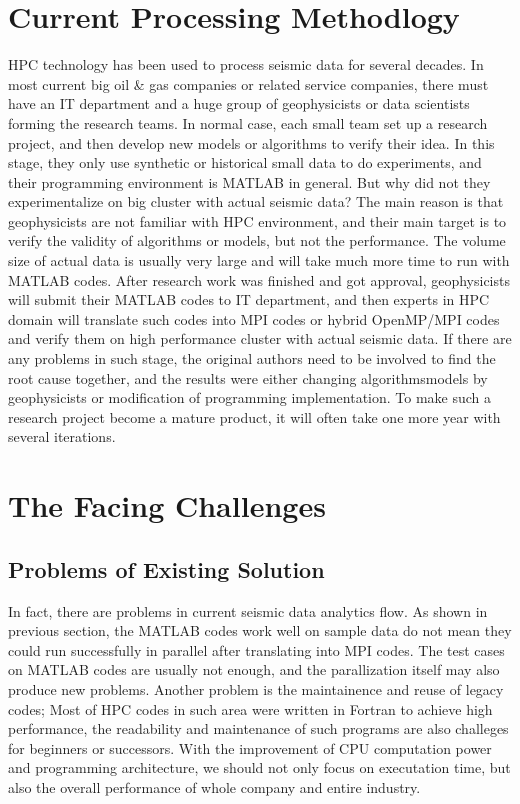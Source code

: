 \section{Current Processing Methodlogy}
HPC technology has been used to process seismic data for several decades. In most current big oil \& gas companies or related service companies, there must have an IT department and a huge group of geophysicists or data scientists forming the research teams. In normal case, each small team set up a research project, and then develop new models or algorithms to verify their idea. In this stage, they only use synthetic or historical small data to do experiments, and their programming environment is MATLAB in general. But why did not they experimentalize on big cluster with actual seismic data? The main reason is that geophysicists are not familiar with HPC environment, and their main target is to verify the validity of algorithms or models, but not the performance. The volume size of actual data is usually very large and will take much more time to run with MATLAB codes. After research work was finished and got approval, geophysicists will submit their MATLAB codes to IT department, and then experts in HPC domain will translate such codes into MPI codes or hybrid OpenMP/MPI codes and verify them on high performance cluster with actual seismic data. If there are any problems in such stage, the original authors need to be involved to find the root cause together, and the results were either changing algorithms\/models by geophysicists or modification of programming implementation. To make such a research project become a mature product, it will often take one more year with several iterations.



\section{The Facing Challenges}

\subsection{Problems of Existing Solution}
In fact, there are problems in current seismic data analytics flow. As shown in previous section, the MATLAB codes work well on sample data do not mean they could run successfully in parallel after translating into MPI codes. The test cases on MATLAB codes are usually not enough, and the parallization itself may also produce new problems.
Another problem is the maintainence and reuse of legacy codes; Most of HPC codes in such area were written in Fortran to achieve high performance, the readability and maintenance of such programs are also challeges for beginners or successors. With the improvement of CPU computation power and programming architecture, we should not only focus on executation time, but also the overall performance of whole company and entire industry. 


